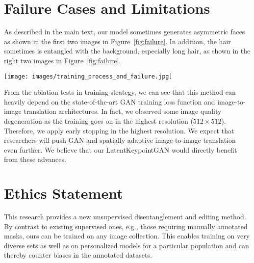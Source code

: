 \documentclass[10pt, conference, compsocconf]{IEEEtran}
\begin{document}
 \section{Failure Cases and Limitations} 
As described in the main text, our model sometimes generates asymmetric faces as shown in the first two images in Figure~\ref{fig:failure}. In addition, the hair sometimes is entangled with the background, especially long hair, as shown in the right two images in Figure~\ref{fig:failure}. 

\begin{figure*}[h]
\begin{center}
   \texttt{[image: images/training\_process\_and\_failure.jpg]}
\end{center}
   \caption{(a) \textbf{Training process.} We visualize the image generated during the training. (b) \textbf{Failure cases.} The left top two images show asymmetric faces: different eye colors for the man and different blusher for the woman. The middle top two images show the entanglement of hair and background. The right top two images show that the pose of head is hidden in the relative positions of other keypoints than the keypoints on the head. We visualize the process of removing parts at the bottom. We sequentially remove the left eye, right eye, mouth, nose, and the entire face. Due to the entanglement of hair and background, the hair remains even if we remove the whole face.}
\label{fig:failure}
\end{figure*}

From the ablation tests in training strategy, we can see that this method can heavily depend on the state-of-the-art GAN training loss function and image-to-image translation architectures. In fact, we observed some image quality degeneration as the training goes on in the highest resolution ($512\times 512$). Therefore, we apply early stopping in the highest resolution. We expect that researchers will push GAN and spatially adaptive image-to-image translation even further. We believe that our LatentKeypointGAN would directly benefit from these advances.
 \section{Ethics Statement}

This research provides a new unsupervised disentanglement and editing method. By contrast to existing supervised ones, e.g., those requiring manually annotated masks, ours can be trained on any image collection. This enables training on very diverse sets as well as on personalized models for a particular population and can thereby counter biases in the annotated datasets. 
\end{document}

